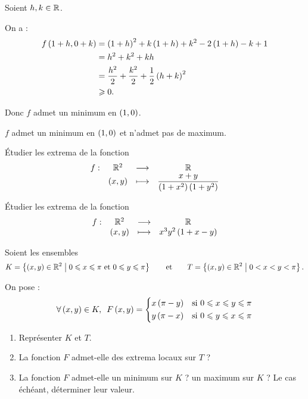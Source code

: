 \begin{corr}
\synthese

Soient \(h,k\in\mathbb{R}\).

On a : \[\begin{aligned}
f\left(1+h,0+k\right)&=\left(1+h\right)^2+k\left(1+h\right)+k^2-2\left(1+h\right)-k+1 \\
&=h^2+k^2+kh \\
&=\dfrac{h^2}{2}+\dfrac{k^2}{2}+\dfrac{1}{2}\left(h+k\right)^2 \\
&\geqslant0.
\end{aligned}\]

Donc \(f\) admet un minimum en \(\left(1,0\right)\).

\conclusion

\(f\) admet un minimum en \(\left(1,0\right)\) et n'admet pas de maximum.
\end{corr}

\begin{exo}[Exercice 9]
Étudier les extrema de la fonction \[\begin{array}[t]{cccc}f : & \mathbb{R}^2 & \longrightarrow & \mathbb{R} \\ & \left(x,y\right) & \longmapsto & \dfrac{x+y}{\left(1+x^2\right)\left(1+y^2\right)}\end{array}\]
\end{exo}

\begin{corr}
\end{corr}

\begin{exo}[Exercice 10]
Étudier les extrema de la fonction \[\begin{array}[t]{cccc}f : & \mathbb{R}^2 & \longrightarrow & \mathbb{R} \\ & \left(x,y\right) & \longmapsto & x^3y^2\left(1+x-y\right)\end{array}\]
\end{exo}

\begin{corr}
\end{corr}

\begin{exo}
Soient les ensembles \[K=\left\lbrace\left(x,y\right)\in\mathbb{R}^2\;\middle|\;0\leqslant x\leqslant\pi\text{ et }0\leqslant y\leqslant\pi\right\rbrace\qquad\text{et}\qquad T=\left\lbrace\left(x,y\right)\in\mathbb{R}^2\;\middle|\;0<x<y<\pi\right\rbrace.\]

On pose : \[\quantifs{\forall\paren{x,y}\in K}F\paren{x,y}=\begin{dcases}
x\paren{\pi-y} &\text{si }0\leq x\leq y\leq\pi \\
y\paren{\pi-x} &\text{si }0\leq y\leq x\leq\pi
\end{dcases}\]

\begin{enumerate}
    \item Représenter \(K\) et \(T\). \\
    \item La fonction \(F\) admet-elle des extrema locaux sur \(T\) ? \\
    \item La fonction \(F\) admet-elle un minimum sur \(K\) ? un maximum sur \(K\) ? Le cas échéant, déterminer leur valeur.
\end{enumerate}
\end{exo}

